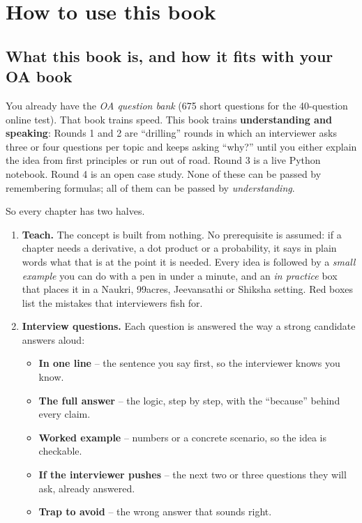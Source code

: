 \chapter*{How to use this book}

\section*{What this book is, and how it fits with your OA book}

You already have the \emph{OA question bank} (675 short questions for the 40-question online test).
That book trains speed. This book trains \textbf{understanding and speaking}: Rounds 1 and 2 are
``drilling'' rounds in which an interviewer asks three or four questions per topic and keeps asking
``why?'' until you either explain the idea from first principles or run out of road. Round 3 is a
live Python notebook. Round 4 is an open case study. None of these can be passed by remembering
formulas; all of them can be passed by \emph{understanding}.

So every chapter has two halves.
\begin{enumerate}
\item \textbf{Teach.} The concept is built from nothing. No prerequisite is assumed: if a chapter
  needs a derivative, a dot product or a probability, it says in plain words what that is at the
  point it is needed. Every idea is followed by a \emph{small example} you can do with a pen in under
  a minute, and an \emph{in practice} box that places it in a Naukri, 99acres, Jeevansathi or Shiksha
  setting. Red boxes list the mistakes that interviewers fish for.
\item \textbf{Interview questions.} Each question is answered the way a strong candidate answers aloud:
  \begin{itemize}
  \item \textbf{\color{accent}In one line} -- the sentence you say first, so the interviewer knows you know.
  \item \textbf{\color{accent}The full answer} -- the logic, step by step, with the ``because'' behind every claim.
  \item \textbf{\color{accent}Worked example} -- numbers or a concrete scenario, so the idea is checkable.
  \item \textbf{\color{accent}If the interviewer pushes} -- the next two or three questions they will ask, already answered.
  \item \textbf{\color{accent}Trap to avoid} -- the wrong answer that sounds right.
  \end{itemize}
\end{enumerate}

